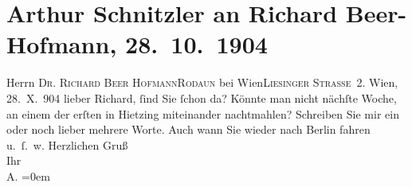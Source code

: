 

         
         \renewcommand{\erwaehntePersonen}{Personen: Richard Beer-Hofmann}
         \renewcommand{\erwaehnteOrte}{Orte: Berlin, Liesingerstraße, Rodaun, Wien, XIII., Hietzing}
         \renewcommand{\erwaehnteWerke}{}
               \section[Arthur Schnitzler an Richard Beer-Hofmann, 28. 10. 1904]{ Arthur Schnitzler an Richard Beer-Hofmann, 28. 10. 1904}\nopagebreak{}\rehead{ }\begin{ledgroupsized}[t]{13cm}\normalsize\beginnumbering{} \toendnotes[C]{\smallbreak\pagebreak[2]} 
\toendnotes[C]{\smallbreak}\pstart{}{\pb}Herrn \textsc{Dr. Richard Beer
                     Hofmann}\pend{}\pstart{}\textsc{Rodaun} bei Wien\pend{}\pstart{}\textsc{Liesinger Straße 2.}\pend{}{\bigskip}\pstart
           \raggedleft{}{\pb}Wien, 28. X. 904\pend
           \pstart
           lieber Richard, ſind Sie ſchon da? Könnte man nicht nächſte Woche,
               an einem der erſten \label{K_L01461-1v}\label{K_L01461-1h} in Hietzing miteinander nachtmahlen?
               Schreiben Sie mir ein oder noch lieber mehrere Worte. Auch wann Sie wieder nach Berlin fahren u. ſ. w.\pend
           \pstart
           Herzlichen Gruß{\\[\baselineskip]}Ihr{\\[\baselineskip]}\spacefill\mbox{A.}\pend
           \leftskip=0em{}
         
         \endnumbering{}\end{ledgroupsized}  \newcommand{\dateiname}{L01461}\newcommand{\titel}{Arthur Schnitzler an Richard Beer-Hofmann, 28. 10. 1904}\newcommand{\editorInnen}{Martin Anton Müller und Gerd-Hermann Susen}
      